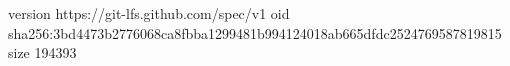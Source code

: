 version https://git-lfs.github.com/spec/v1
oid sha256:3bd4473b2776068ca8fbba1299481b994124018ab665dfdc2524769587819815
size 194393
